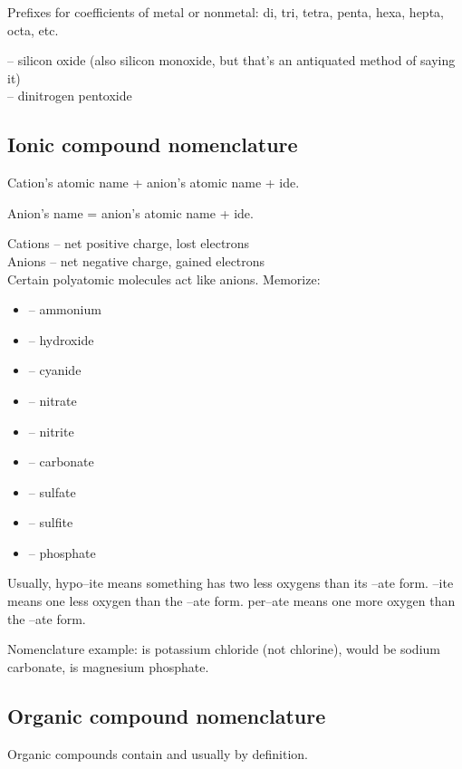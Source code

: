 \documentclass[letterpaper, 12pt]{article}
\begin{document}
	Prefixes for coefficients of metal or nonmetal: di, tri, tetra, penta, hexa, hepta, octa, etc.

	 -- silicon oxide (also silicon monoxide, but that's an antiquated method of saying it)\\
	 -- dinitrogen pentoxide\\

	\subsection{Ionic compound nomenclature}
	Cation's atomic name + anion's atomic name + ide.

	Anion's name = anion's atomic name + ide.

	Cations -- net positive charge, lost electrons\\
	Anions -- net negative charge, gained electrons\\

	Certain polyatomic molecules act like anions. Memorize:
	\begin{itemize}
		\item {} -- ammonium
		\item {} -- hydroxide
		\item {} -- cyanide
		\item {} -- nitrate
		\item {} -- nitrite
		\item {} -- carbonate
		\item {} -- sulfate
		\item {} -- sulfite
		\item {} -- phosphate
	\end{itemize}

	Usually, hypo--ite means something has two less oxygens than its --ate form. --ite means one less oxygen than the --ate form. per--ate means one more oxygen than the --ate form.

	Nomenclature example:  is potassium chloride (not chlorine),  would be sodium carbonate,  is magnesium phosphate.

	\subsection{Organic compound nomenclature}
	Organic compounds contain  and usually  by definition.
\end{document}
